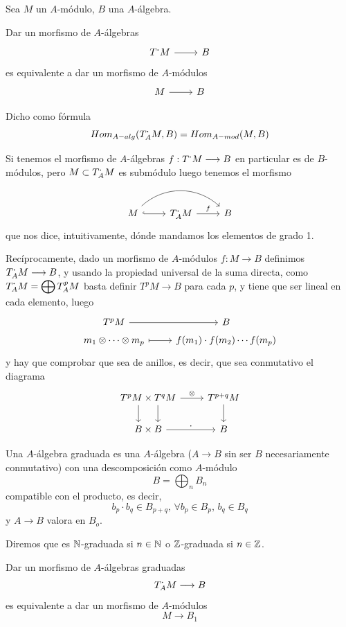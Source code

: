  Sea $M$ un $A$-m\'odulo, $B$ una $A$-\'algebra. 
\begin{propi}
    Dar un morfismo de $A$-\'algebras $$\bt T^{\bdot} M \arrow{r} & B \et$$ es equivalente a dar un morfismo de $A$-m\'odulos
    $$\bt M \arrow{r} & B \et$$

    Dicho como f\'ormula
    $$Hom_{A-alg} (T^{\boldsymbol{\cdot}}_A M, B) = Hom_{A-mod} (M,B)$$
\end{propi}
\begin{dem}
    Si tenemos el morfismo de $A$-\'algebras $f: T^{\boldsymbol{\cdot}}M \longrightarrow B$ en particular es de $B$-m\'odulos, pero $M \subset T^{\boldsymbol{\cdot}}_A M$ es subm\'odulo luego tenemos el morfismo
    $$\bt M \arrow[hook]{r} \arrow[bend left=15mm]{rr}& T^{\bdot}_A M \arrow{r}{f} & B \et$$
    que nos dice, intuitivamente, d\'onde mandamos los elementos de grado 1.

    Rec\'iprocamente, dado un morfismo de $A$-m\'odulos $f: M \longrightarrow B$ definimos $T^{\boldsymbol{\cdot}}_AM \longrightarrow B$, y usando la propiedad universal de la suma directa, como $\displaystyle T^{\boldsymbol{\cdot}}_AM = \bigoplus T^p_A M$ basta definir $T^pM \longrightarrow B$ para cada $p$, y tiene que ser lineal en cada elemento, luego
    $$\bt T^pM \arrow{r} & B \\[-5mm] m_1 \otimes \cdots \otimes m_p \arrow[mapsto]{r} &[10mm]  f(m_1) \cdot f(m_2) \cdots f(m_p) \et$$
    y hay que comprobar que sea de anillos, es decir, que sea conmutativo el diagrama
    $$\bt T^pM \arrow[shift left=10pt]{d} \times T^qM \arrow[shift right=10pt]{d} \arrow{r}{\otimes} & T^{p+q} M \arrow{d} \\ B \times B \arrow{r}{\bdot} & B\et$$
\end{dem}
\begin{defi}
    Una $A$-\'algebra graduada es una $A$-\'algebra ($A\longrightarrow B$ sin ser $B$ necesariamente conmutativo) con una descomposici\'on como $A$-m\'odulo
    $$B = \bigoplus_n B_n$$
    compatible con el producto, es decir, 
    $$b_p \cdot b_q \in B_{p+q}, \, \forall b_p \in B_p, \, b_q \in B_q$$
    y $A\longrightarrow B$ valora en $B_o$. 
    
    Diremos que es $\mathbb{N}$-graduada si $n \in \mathbb{N}$ o $\mathbb{Z}$-graduada si $n \in \mathbb{Z}$. 
\end{defi}
\begin{propi}
     Dar un morfismo de $A$-\'algebras graduadas $$T^{\boldsymbol{\cdot}}_AM \longrightarrow B$$ es equivalente a dar un morfismo de $A$-m\'odulos 
    $$M \longrightarrow B_1$$
\end{propi}

